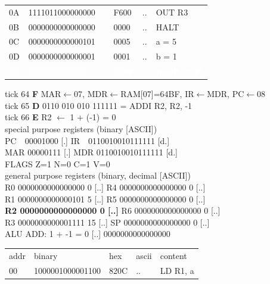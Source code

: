 \begin{tcolorbox}[stepbox, title={Instruction 21 \hfill ticks 61 to 63 \quad ST R3, result}]
{\begin{tabular}{@{}lllll@{}}
0A & 1111011000000000 & F600 & .. & OUT R3\\
0B & 0000000000000000 & 0000 & .. & HALT\\
\rowcolor{datac}0C & 0000000000000101 & 0005 & .. & a = 5\\
\rowcolor{datac}0D & 0000000000000001 & 0001 & .. & b = 1\\
\rowcolor{wrt}\textcolor{white}{\textbf{0E}} & \textcolor{white}{\textbf{0000000000001111}} & \textcolor{white}{\textbf{000F}} & \textcolor{white}{\textbf{..}} & \textcolor{white}{\textbf{result = 15}}\\
\end{tabular}}
\end{tcolorbox}\hfill\begin{tcolorbox}[stepbox, title={Instruction 22 \hfill ticks 64 to 66 \quad ADDI R2, R2, -1}]
\textcolor{dim}{tick 64} \textbf{F} MAR$\leftarrow$07, MDR$\leftarrow$RAM[07]=64BF, IR$\leftarrow$MDR, PC$\leftarrow$08\\
\textcolor{dim}{tick 65} \textbf{D} 0110 010 010 111111 = ADDI R2, R2, -1\\
\textcolor{dim}{tick 66} \textbf{E} R2 $\leftarrow$ 1 + (-1) = 0\\[2pt]
\textcolor{dim}{special purpose registers (binary [ASCII])}\\
PC~~00001000 [.] \hfill IR~~0110010010111111 [d.]\\
MAR 00000111 [.] \hfill MDR 0110010010111111 [d.]\\
FLAGS Z=1 N=0 C=1 V=0\\[2pt]
\textcolor{dim}{general purpose registers (binary, decimal [ASCII])}\\
R0 0000000000000000 0 [..] \hfill R4 0000000000000000 0 [..]\\
R1 0000000000000101 5 [..] \hfill R5 0000000000000000 0 [..]\\
\textcolor{wrt}{\textbf{R2 0000000000000000 0 [..]}} \hfill R6 0000000000000000 0 [..]\\
R3 0000000000001111 15 [..] \hfill SP 0000000000000000 0 [..]\\
\textcolor{dim}{ALU} ADD: 1 + -1 = 0 [..] \hfill 0000000000000000\\[2pt]
{\setlength{\tabcolsep}{2pt}\begin{tabular}{@{}lllll@{}}
\textcolor{dim}{addr} & \textcolor{dim}{binary} & \textcolor{dim}{hex} & \textcolor{dim}{ascii} & \textcolor{dim}{content}\\
00 & 1000001000001100 & 820C & .. & LD R1, a\\

\end{tabular}}
\end{tcolorbox}
